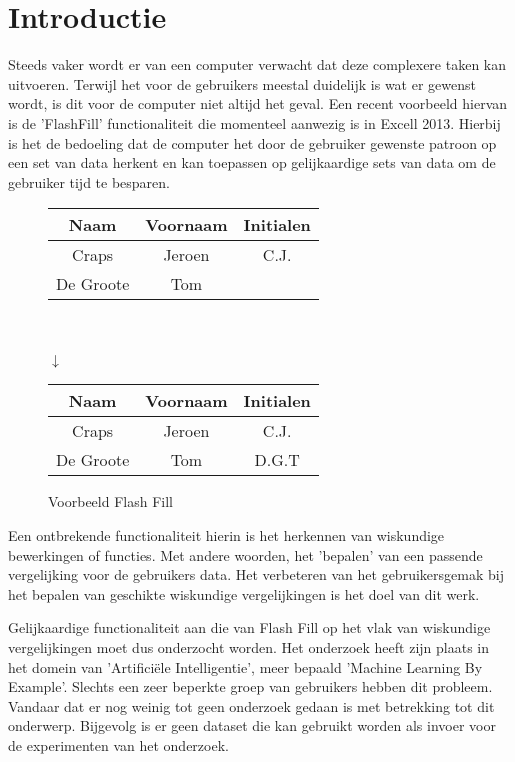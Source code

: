 \documentclass[Main.tex]{subfiles}
\begin{document}
\section{Introductie}
Steeds vaker wordt er van een computer verwacht dat deze complexere taken kan uitvoeren. Terwijl het voor de gebruikers meestal duidelijk is wat er gewenst wordt, is dit voor de computer niet altijd het geval. Een recent voorbeeld hiervan is de 'FlashFill' functionaliteit die momenteel aanwezig is in Excell 2013. Hierbij is het de bedoeling dat de computer het door de gebruiker gewenste patroon op een set van data herkent en kan toepassen op gelijkaardige sets van data om de gebruiker tijd te besparen. \cite{flashFill}

\begin{figure}[!htb]
\centering
\begin{framed}
\begin{tabular}{| c | c | c |}
\hline
Naam & Voornaam & Initialen \\ \hline
Craps & Jeroen & C.J. \\ \hline
De Groote & Tom &  \\ \hline
\end{tabular} \\ \\
$\downarrow$ \\
\begin{tabular}{| c | c | c |}
\hline
Naam & Voornaam & Initialen \\ \hline
Craps & Jeroen & C.J. \\ \hline
De Groote & Tom &  D.G.T \\ \hline
\end{tabular}
\end{framed}
\caption{Voorbeeld Flash Fill}
\label{fig:flashfill}
\end{figure}

\par Een ontbrekende functionaliteit hierin is het herkennen van wiskundige bewerkingen of functies. Met andere woorden, het 'bepalen' van een passende vergelijking voor de gebruikers data. Het verbeteren van het gebruikersgemak bij het bepalen van geschikte wiskundige vergelijkingen is het doel van dit werk. \par  %

Gelijkaardige functionaliteit aan die van Flash Fill op het vlak van wiskundige vergelijkingen moet dus onderzocht worden. Het onderzoek heeft zijn plaats in het domein van 'Artifici\"ele Intelligentie', meer bepaald 'Machine Learning By Example'. Slechts een zeer beperkte groep van gebruikers hebben dit probleem. Vandaar dat er nog weinig tot geen onderzoek gedaan is met betrekking tot dit onderwerp. Bijgevolg is er geen dataset die kan gebruikt worden als invoer voor de experimenten van het onderzoek.  \par
\end{document}
